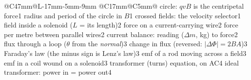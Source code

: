 {\begin{longtable}{@{}C{47mm}@{\hspace{3mm}}L{\dimexpr\linewidth-47mm-17mm-5mm-9mm\relax}%
    @{\hspace{3mm}}C{17mm}@{\hspace{3mm}}C{5mm}@{}}
    {circle: $qvB$ is the centripetal force}{1}
    {radius and period of the circle in $B$}{1}
    {crossed fields: the velocity selector}{1}
  \essfsnext
    {field inside a solenoid ($L$ = its length)}{2}
    {force on a current-carrying wire}{2}
    {force per metre between parallel wires}{2}
    {current balance: reading ($\Delta m$, kg) to force}{2}
  \essfsnext
    {flux through a loop ($\theta$ from the \emph{normal})}{3}
    {change in flux (reversed: $\lvert\Delta\Phi\rvert = 2BA$)}{3}
    {Faraday's law (the minus sign is Lenz's law)}{3}
    {emf of a rod moving across a field}{3}
    {emf in a coil wound on a solenoid}{3}
  \essfsnext
    {transformer (turns) equation, on AC}{4}
    {ideal transformer: power in = power out}{4}

\end{longtable}}
